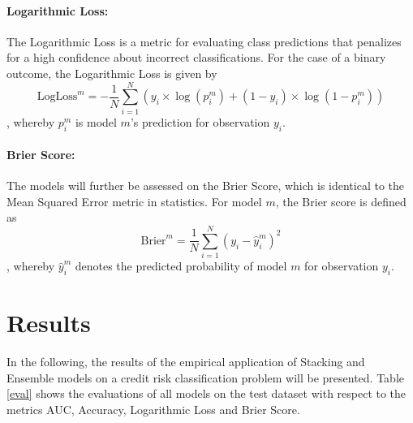 \documentclass[12pt]{article}
\begin{document}
\paragraph{Logarithmic Loss:} The Logarithmic Loss is a metric for evaluating class predictions that penalizes for a high confidence about incorrect classifications. For the case of a binary outcome, the Logarithmic Loss is given by\\
\begin{equation}
\text{LogLoss}^m = - \frac{1}{N}\sum_{i=1}^{N}(y_i\times\log(p^m_i) + (1 - y_i)\times\log(1 - p^m_i))
\end{equation}
, whereby $p^m_i$ is model $m$'s prediction for observation $y_i$.

\paragraph{Brier Score:} The models will further be assessed on the Brier Score, which is identical to the Mean Squared Error metric in statistics. For model $m$, the Brier score is defined as 
\begin{equation}
\text{Brier}^m = \frac{1}{N}\sum_{i=1}^{N}(y_i - \hat{y}^m_i)^2
\end{equation}
, whereby $\hat{y}^m_i$ denotes the predicted probability of model $m$ for observation $y_i$. 


\section{Results}\label{results}
In the following, the results of the empirical application of Stacking and Ensemble models on a credit risk classification problem will be presented. Table \ref{eval} shows the evaluations of all models on the test dataset with respect to the metrics AUC, Accuracy, Logarithmic Loss and Brier Score. 
\end{document}
